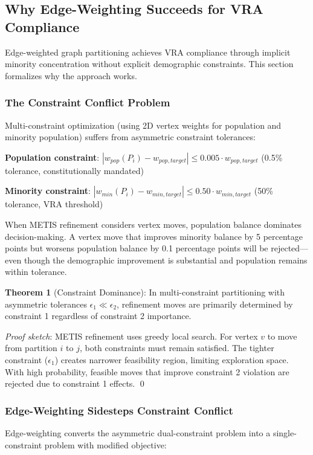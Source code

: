 \subsection{Why Edge-Weighting Succeeds for VRA Compliance}

Edge-weighted graph partitioning achieves VRA compliance through implicit minority concentration without explicit demographic constraints. This section formalizes why the approach works.

\subsubsection{The Constraint Conflict Problem}

Multi-constraint optimization (using 2D vertex weights for population and minority population) suffers from asymmetric constraint tolerances:

\textbf{Population constraint}: $|w_{pop}(P_i) - w_{pop,target}| \leq 0.005 \cdot w_{pop,target}$ (0.5\% tolerance, constitutionally mandated)

\textbf{Minority constraint}: $|w_{min}(P_i) - w_{min,target}| \leq 0.50 \cdot w_{min,target}$ (50\% tolerance, VRA threshold)

When METIS refinement considers vertex moves, population balance dominates decision-making. A vertex move that improves minority balance by 5 percentage points but worsens population balance by 0.1 percentage points will be rejected—even though the demographic improvement is substantial and population remains within tolerance.

\textbf{Theorem 1} (Constraint Dominance): In multi-constraint partitioning with asymmetric tolerances $\epsilon_1 \ll \epsilon_2$, refinement moves are primarily determined by constraint 1 regardless of constraint 2 importance.

\textit{Proof sketch}: METIS refinement uses greedy local search. For vertex $v$ to move from partition $i$ to $j$, both constraints must remain satisfied. The tighter constraint ($\epsilon_1$) creates narrower feasibility region, limiting exploration space. With high probability, feasible moves that improve constraint 2 violation are rejected due to constraint 1 effects. \qed

\subsubsection{Edge-Weighting Sidesteps Constraint Conflict}

Edge-weighting converts the asymmetric dual-constraint problem into a single-constraint problem with modified objective:

